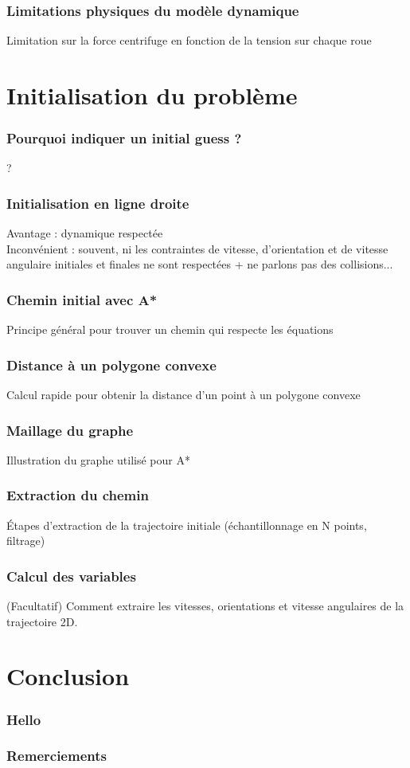 \documentclass{beamer}
\begin{document}
	\begin{frame}
		\frametitle{Limitations physiques du modèle dynamique}
		Limitation sur la force centrifuge en fonction de la tension sur chaque roue
	\end{frame}
	
	
	\section{Initialisation du problème}
	
	\begin{frame}
		\frametitle{Pourquoi indiquer un initial guess ?}
		?
	\end{frame}
	
	\begin{frame}
		\frametitle{Initialisation en ligne droite}
		Avantage : dynamique respectée\\
		Inconvénient : souvent, ni les contraintes de vitesse, d'orientation et de vitesse angulaire initiales et finales ne sont respectées + ne parlons pas des collisions...
	\end{frame}
	
	\begin{frame}
		\frametitle{Chemin initial avec A*}
		Principe général pour trouver un chemin qui respecte les équations
	\end{frame}
	
	\begin{frame}
		\frametitle{Distance à un polygone convexe}
		Calcul rapide pour obtenir la distance d'un point à un polygone convexe
	\end{frame}
	
	\begin{frame}
		\frametitle{Maillage du graphe}
		Illustration du graphe utilisé pour A*
	\end{frame}
	
	\begin{frame}
		\frametitle{Extraction du chemin}
		Étapes d'extraction de la trajectoire initiale (échantillonnage en N points, filtrage)
	\end{frame}
	
	\begin{frame}
		\frametitle{Calcul des variables}
		(Facultatif) Comment extraire les vitesses, orientations et vitesse angulaires de la trajectoire 2D.
	\end{frame}
	
	
	\section{Conclusion}
	
	\begin{frame}
		\frametitle{Hello}
	\end{frame}
	
	\begin{frame}
		\frametitle{Remerciements}
	\end{frame}
\end{document}
